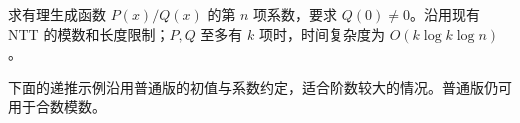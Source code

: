 求有理生成函数 $P(x)/Q(x)$ 的第 $n$ 项系数，要求 $Q(0)\ne0$。沿用现有 NTT 的模数和长度限制；$P,Q$ 至多有 $k$ 项时，时间复杂度为 $O(k\log k\log n)$。

下面的递推示例沿用普通版的初值与系数约定，适合阶数较大的情况。普通版仍可用于合数模数。
